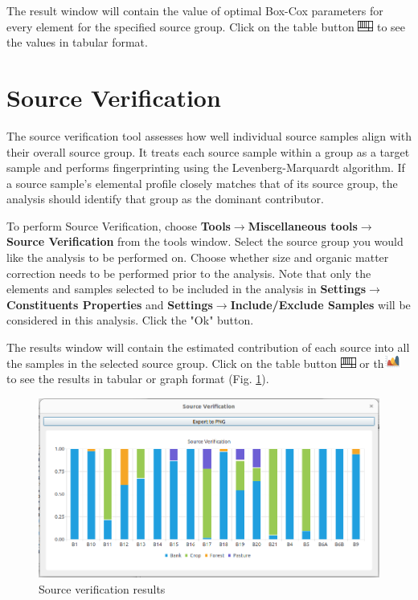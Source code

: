 \documentclass[12pt]{report}
\begin{document}
The result window will contain the value of optimal Box-Cox parameters for every element for the specified source group. Click on the table button \includegraphics[width=0.5cm]{Figures/table.png} to see the values in tabular format. 

\section{Source Verification}
The source verification tool assesses how well individual source samples align with their overall source group. It treats each source sample within a group as a target sample and performs fingerprinting using the Levenberg-Marquardt algorithm. If a source sample's elemental profile closely matches that of its source group, the analysis should identify that group as the dominant contributor. 

To perform Source Verification, choose \textbf{Tools}$\rightarrow$\textbf{Miscellaneous tools}$\rightarrow$\textbf{Source Verification} from the tools window. Select the source group you would like the analysis to be performed on. Choose whether size and organic matter correction needs to be performed prior to the analysis. Note that only the elements and samples selected to be included in the analysis in \textbf{Settings}$\rightarrow$\textbf{Constituents Properties} and \textbf{Settings}$\rightarrow$\textbf{Include/Exclude Samples} will be considered in this analysis. Click the "Ok" button. 

The results window will contain the estimated contribution of each source into all the samples in the selected source group. Click on the table button \includegraphics[width=0.5cm]{Figures/table.png} or th\includegraphics[width=0.5cm]{Figures/Graph.png} to see the results in tabular or graph format (Fig. \ref{fig:source_verification}).


\begin{figure}[ht]
    \centering
    \includegraphics[width=12cm]{Figures/Source_verify_graph.png} 
    \caption{Source verification results}
    \label{fig:source_verification}
\end{figure}
\FloatBarrier
\end{document}
